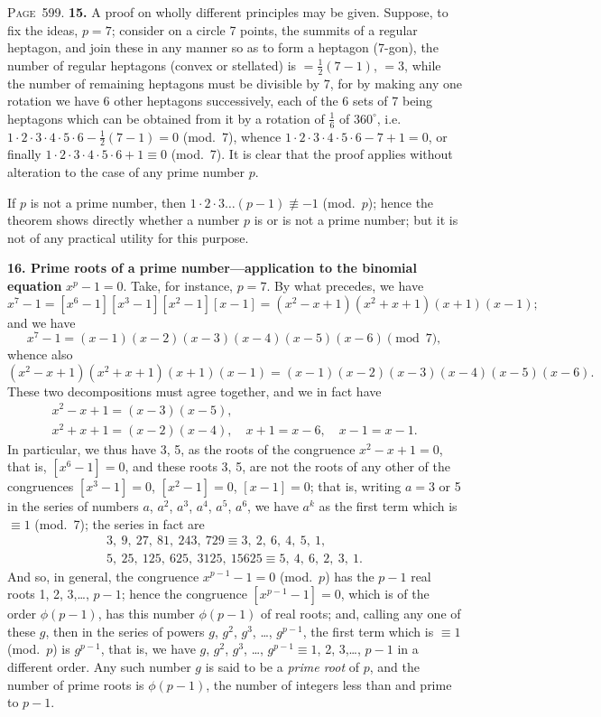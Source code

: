 \documentclass[11pt,a4paper]{article}
\theoremstyle{definition}
\begin{document}
\newpage
\noindent\textsc{Page~599.} \textbf{15.} A proof on wholly different principles may be given. Suppose, to fix the ideas, $p=7$; consider on a circle 7 points, the summits of a regular heptagon, and join these in any manner so as to form a heptagon (7-gon), the number of regular heptagons (convex or stellated) is $=\tfrac12(7-1)$, $=3$, while the number of remaining heptagons must be divisible by 7, for by making any one rotation we have 6 other heptagons successively, each of the 6 sets of 7 being heptagons which can be obtained from it by a rotation of $\tfrac16$ of $360^\circ$, i.e.\ $1\cdot2\cdot3\cdot4\cdot5\cdot6-\tfrac12(7-1)=0$ (mod.\ 7), whence $1\cdot2\cdot3\cdot4\cdot5\cdot6-7+1=0$, or finally $1\cdot2\cdot3\cdot4\cdot5\cdot6+1\equiv0$ (mod.\ 7). It is clear that the proof applies without alteration to the case of any prime number $p$.

If $p$ is not a prime number, then $1\cdot2\cdot3\ldots(p-1)\not\equiv-1$ (mod.\ $p$); hence the theorem shows directly whether a number $p$ is or is not a prime number; but it is not of any practical utility for this purpose.

\textbf{16. Prime roots of a prime number---application to the binomial equation} $x^p-1=0$. Take, for instance, $p=7$. By what precedes, we have
\[
x^7-1=[x^6-1][x^3-1][x^2-1][x-1]=(x^2-x+1)(x^2+x+1)(x+1)(x-1);
\]
and we have
\[
x^7-1=(x-1)(x-2)(x-3)(x-4)(x-5)(x-6)\pmod{7},
\]
whence also
\[
(x^2-x+1)(x^2+x+1)(x+1)(x-1)=(x-1)(x-2)(x-3)(x-4)(x-5)(x-6).
\]
These two decompositions must agree together, and we in fact have
\begin{gather*}
x^2-x+1=(x-3)(x-5),\\
x^2+x+1=(x-2)(x-4),\quad x+1=x-6,\quad x-1=x-1.
\end{gather*}
In particular, we thus have 3, 5, as the roots of the congruence $x^2-x+1=0$, that is, $[x^6-1]=0$, and these roots 3, 5, are not the roots of any other of the congruences $[x^3-1]=0$, $[x^2-1]=0$, $[x-1]=0$; that is, writing $a=3$ or 5 in the series of numbers $a$, $a^2$, $a^3$, $a^4$, $a^5$, $a^6$, we have $a^k$ as the first term which is $\equiv1$ (mod.\ 7); the series in fact are
\begin{gather*}
3,\ 9,\ 27,\ 81,\ 243,\ 729\equiv3,\ 2,\ 6,\ 4,\ 5,\ 1,\\
5,\ 25,\ 125,\ 625,\ 3125,\ 15625\equiv5,\ 4,\ 6,\ 2,\ 3,\ 1.
\end{gather*}
And so, in general, the congruence $x^{p-1}-1=0$ (mod.\ $p$) has the $p-1$ real roots 1, 2, 3,\ldots, $p-1$; hence the congruence $[x^{p-1}-1]=0$, which is of the order $\phi(p-1)$, has this number $\phi(p-1)$ of real roots; and, calling any one of these $g$, then in the series of powers $g$, $g^2$, $g^3$, \ldots, $g^{p-1}$, the first term which is $\equiv1$ (mod.\ $p$) is $g^{p-1}$, that is, we have $g$, $g^2$, $g^3$, \ldots, $g^{p-1}\equiv1$, 2, 3,\ldots, $p-1$ in a different order. Any such number $g$ is said to be a \textit{prime root} of $p$, and the number of prime roots is $\phi(p-1)$, the number of integers less than and prime to $p-1$.
\end{document}
